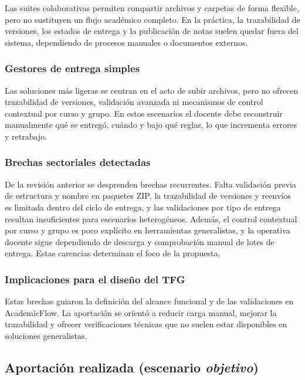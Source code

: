 Las suites colaborativas permiten compartir archivos y carpetas
de forma flexible, pero no sustituyen un flujo acad\'emico completo.
En la pr\'actica, la trazabilidad de versiones, los estados de entrega
y la publicaci\'on de notas suelen quedar fuera del sistema,
dependiendo de procesos manuales o documentos externos.

\subsubsection{Gestores de entrega simples}

Las soluciones m\'as ligeras se centran en el acto de subir archivos,
pero no ofrecen trazabilidad de versiones, validaci\'on avanzada
ni mecanismos de control contextual por curso y grupo. En estos
escenarios el docente debe reconstruir manualmente qu\'e se entreg\'o,
cu\'ando y bajo qu\'e reglas, lo que incrementa errores y retrabajo.

\subsubsection{Brechas sectoriales detectadas}

De la revisi\'on anterior se desprenden brechas recurrentes. Falta validaci\'on previa de estructura y nombre en paquetes ZIP, la trazabilidad de versiones y reenv\'ios es limitada dentro del ciclo de entrega, y las validaciones por tipo de entrega resultan insuficientes para escenarios heterog\'eneos. Adem\'as, el control contextual por curso y grupo es poco expl\'icito en herramientas generalistas, y la operativa docente sigue dependiendo de descarga y comprobaci\'on manual de lotes de entrega. Estas carencias determinan el foco de la propuesta.

\subsubsection{Implicaciones para el dise\~no del TFG}

Estas brechas guiaron la definici\'on del alcance funcional y de las
validaciones en AcademicFlow. La aportaci\'on se orient\'o a reducir carga
manual, mejorar la trazabilidad y ofrecer verificaciones t\'ecnicas
que no suelen estar disponibles en soluciones generalistas.

\subsection{Aportaci\'on realizada (escenario \emph{objetivo})}

